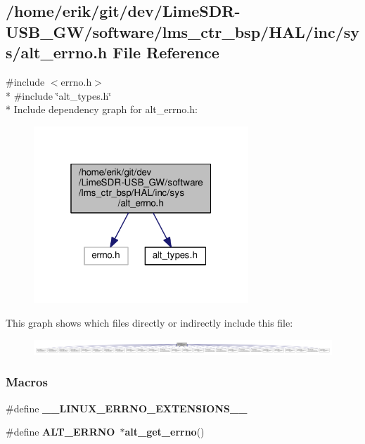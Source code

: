 \subsection{/home/erik/git/dev/\+Lime\+S\+D\+R-\/\+U\+S\+B\+\_\+\+G\+W/software/lms\+\_\+ctr\+\_\+bsp/\+H\+A\+L/inc/sys/alt\+\_\+errno.h File Reference}
\label{alt__errno_8h}
{\ttfamily \#include $<$errno.\+h$>$}\\*
{\ttfamily \#include \char`\"{}alt\+\_\+types.\+h\char`\"{}}\\*
Include dependency graph for alt\+\_\+errno.\+h\+:
\nopagebreak
\begin{figure}[H]
\begin{center}
\leavevmode
\includegraphics[width=229pt]{d0/da3/alt__errno_8h__incl}
\end{center}
\end{figure}
This graph shows which files directly or indirectly include this file\+:
\nopagebreak
\begin{figure}[H]
\begin{center}
\leavevmode
\includegraphics[width=350pt]{dc/d83/alt__errno_8h__dep__incl}
\end{center}
\end{figure}
\subsubsection*{Macros}
\begin{DoxyCompactItemize}
\item 
\#define {\bf \+\_\+\+\_\+\+L\+I\+N\+U\+X\+\_\+\+E\+R\+R\+N\+O\+\_\+\+E\+X\+T\+E\+N\+S\+I\+O\+N\+S\+\_\+\+\_\+}
\item 
\#define {\bf A\+L\+T\+\_\+\+E\+R\+R\+NO}~$\ast${\bf alt\+\_\+get\+\_\+errno}()
\end{DoxyCompactItemize}
